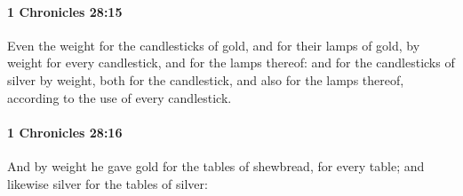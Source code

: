 		\paragraph{1 Chronicles 28:15} %
			\label{1CHRONICLES-28-15}

			Even the weight for the candlesticks of gold, and for their lamps of gold, by weight for every candlestick, and for the lamps thereof: and for the candlesticks of silver by weight, both for the candlestick, and also for the lamps thereof, according to the use of every candlestick.


		\paragraph{1 Chronicles 28:16} %
			\label{1CHRONICLES-28-16}

			And by weight he gave gold for the tables of shewbread, for every table; and likewise silver for the tables of silver:

